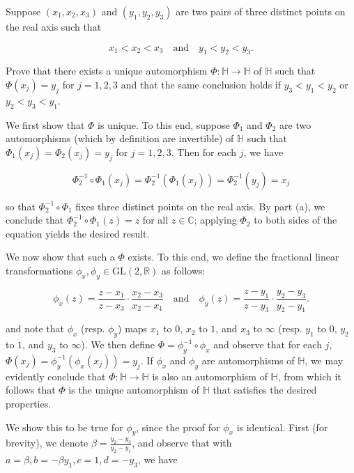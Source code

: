 Suppose $(x_1, x_2, x_3)$ and $(y_1, y_2, y_3)$ are two pairs of three distinct points on the real axis such that

$$
x_1 < x_2 < x_3 \quad \text{and} \quad y_1 < y_2 < y_3.
$$

Prove that there exists a unique automorphism $\Phi : \mathbb{H} \to \mathbb{H}$ of $\mathbb{H}$ such that 
$\Phi(x_j) = y_j$ for $j = 1, 2, 3$ and that the same conclusion holds if $y_3 < y_1 < y_2$ or $y_2 < y_3 < y_1$.

\begin{solution}
  We first show that $\Phi$ is unique. To this end, suppose $\Phi_1$ and $\Phi_2$ are two automorphisms (which by 
  definition are invertible) of $\mathbb{H}$ such that $\Phi_1(x_j) = \Phi_2(x_j) = y_j$ for $j = 1, 2, 3$. Then for 
  each $j$, we have

  $$
  \Phi_2^{-1} \circ \Phi_1(x_j) = \Phi_2^{-1} \left(\Phi_1(x_j)\right) = \Phi_2^{-1}(y_j) = x_j
  $$

  so that $\Phi_2^{-1} \circ \Phi_1$ fixes three distinct points on the real axis. By part (a), we conclude that 
  $\Phi_2^{-1} \circ \Phi_1(z) = z$ for all $z \in \mathbb{C}$; applying $\Phi_2$ to both sides of the equation yields 
  the desired result.

  We now show that such a $\Phi$ exists. To this end, we define the fractional linear transformations
  $\phi_x, \phi_y \in \text{GL}(2, \mathbb{R})$ as follows:

  $$
  \phi_x(z) = \frac{z - x_1}{z - x_3} \cdot \frac{x_2 - x_3}{x_2 - x_1} \quad \text{and} \quad \phi_y(z) = \frac{z - y_1}{z - y_3} \cdot \frac{y_2 - y_3}{y_2 - y_1}.
  $$

  and note that $\phi_x$ (resp. $\phi_y$) maps $x_1$ to $0$, $x_2$ to $1$, and $x_3$ to $\infty$ (resp. $y_1$ to $0$, 
  $y_2$ to $1$, and $y_3$ to $\infty$). We then define $\Phi = \phi_y^{-1} \circ \phi_x$ and observe that for each $j$,
  $\Phi(x_j) = \phi_y^{-1}(\phi_x(x_j)) = y_j$. If $\phi_x$ and $\phi_y$ are automorphisms of $\mathbb{H}$, we may 
  evidently conclude that $\Phi: \mathbb{H} \to \mathbb{H}$ is also an automorphism of $\mathbb{H}$, from which it 
  follows that $\Phi$ is the unique automorphism of $\mathbb{H}$ that satisfies the desired properties.

  We show this to be true for $\phi_y$, since the proof for $\phi_x$ is identical. First (for brevity), we denote 
  $\beta = \frac{y_2 - y_3}{y_2 - y_1}$, and observe that with $a = \beta, b = -\beta y_1, c = 1, d = -y_3$, we have


\end{solution}
